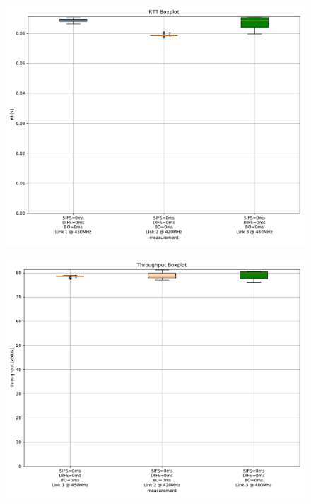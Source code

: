 \documentclass{article}
\begin{document}
\begin{figure}
	\includegraphics[width=\textwidth]{no_wait_single/boxplot/rtt_boxplot}
\end{figure}

\begin{figure}
	\includegraphics[width=\textwidth]{no_wait_single/boxplot/throughput_boxplot}
\end{figure}

\end{document}
